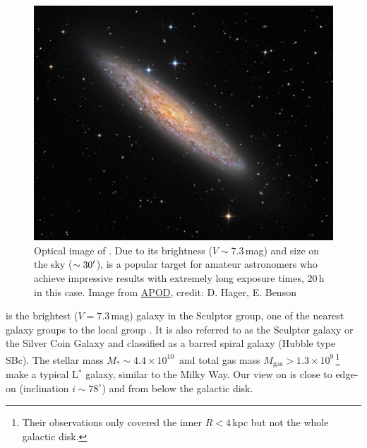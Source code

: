 
\chapter{}
\label{introduction: chapter: NGC253}


\vspace{-0.5cm}
\begin{figure}[h]
	\centering
	\includegraphics[width=\linewidth]{images/chapters/introduction/ngc253/NGC253_Apod.pdf}
	\caption[Optical image of NGC253]{Optical image of . Due to its brightness ($V \sim 7.3$\,mag) and size on the sky ($\sim 30^{\prime}$),  is a popular target for amateur astronomers who achieve impressive results with extremely long exposure times, 20\,h in this case. Image from \href{https://apod.nasa.gov/apod/ap161103.html}{APOD}, credit: D. Hager, E. Benson}
	\label{introduction: figure: NGC253: optical}
\end{figure}

 is the brightest ($V=7.3$\,mag) galaxy in the Sculptor group, one of the nearest galaxy groups to the local group \citep{2005AJ....129..178K}.
It is also referred to as the Sculptor galaxy or the Silver Coin Galaxy and classified as a barred spiral galaxy (Hubble type SBc).
The stellar mass $M_\ast \sim 4.4 \times 10^{10}$\,\Msun \citep{2011ApJ...736...24B} and total gas mass $M_\mathrm{gas} > 1.3 \times 10^9$\,\Msun \citep{2000PASJ...52..785S}\footnote{Their observations only covered the inner $R<4$\,kpc but not the whole galactic disk.} make  a typical L$^\ast$ galaxy, similar to the Milky Way.
Our view on  is close to edge-on (inclination $i\sim78^\circ$) and from below the galactic disk.

